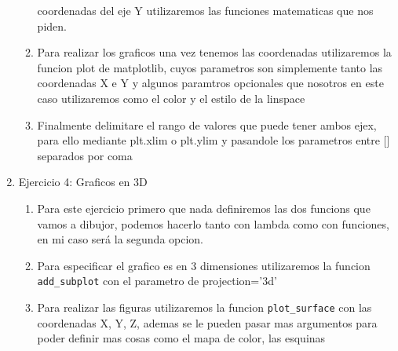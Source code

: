 \documentclass[12pt]{article}
\begin{document}
\begin{enumerate}
\begin{enumerate}
    coordenadas del eje Y utilizaremos las funciones matematicas que nos piden.
    \item[] Para realizar los graficos una vez tenemos las coordenadas utilizaremos la funcion plot de matplotlib, cuyos parametros son simplemente tanto las coordenadas X e Y y algunos paramtros opcionales que nosotros en este caso utilizaremos como el color y el estilo de la linspace
    \item[] Finalmente delimitare el rango de valores que puede tener ambos ejex, para ello mediante plt.xlim o plt.ylim y pasandole los parametros entre [] separados por coma
  \end{enumerate} 
  \item[] Ejercicio 4: Graficos en 3D
  \begin{enumerate}
    \item[] Para este ejercicio primero que nada definiremos las dos funcions que vamos a dibujor, podemos hacerlo tanto con lambda como con funciones, en mi caso será la segunda opcion.
    \item[] Para especificar el grafico es en 3 dimensiones utilizaremos la funcion \verb|add_subplot| con el parametro de projection='3d'
    \item[] Para realizar las figuras utilizaremos la funcion \verb|plot_surface| con las coordenadas X, Y, Z, ademas se le pueden pasar mas argumentos para poder definir mas cosas como el mapa de color, las esquinas 
  \end{enumerate} 
\end{enumerate}
\end{document}
